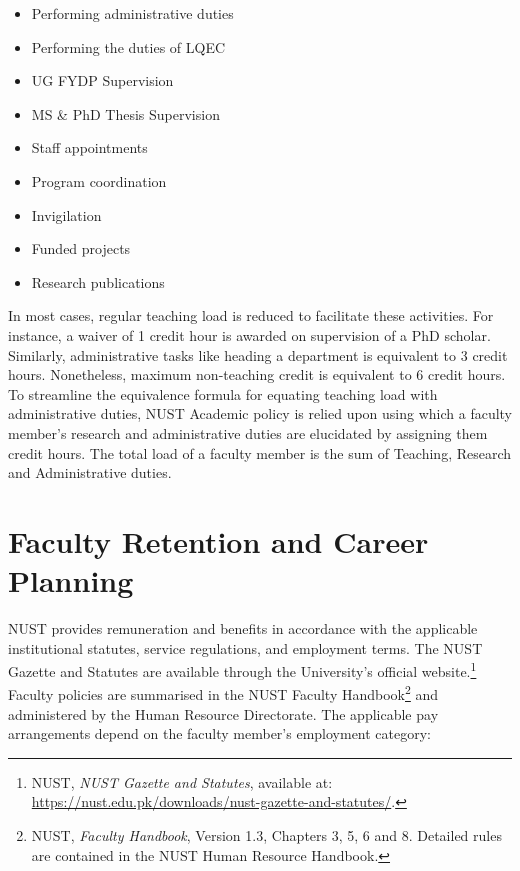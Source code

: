 \begin{itemize}[noitemsep, topsep=0pt]
\item Performing administrative duties 
\item Performing the duties of LQEC
\item UG FYDP Supervision 
\item MS \& PhD Thesis Supervision
\item Staff appointments
\item Program coordination
\item Invigilation 
\item Funded projects
\item Research publications
\end{itemize}

In most cases, regular teaching load is reduced to facilitate these activities. For instance, a waiver of 1 credit hour is awarded on supervision of a PhD scholar. Similarly, administrative tasks like heading a department is equivalent to 3 credit hours. Nonetheless, maximum non-teaching credit is equivalent to 6 credit hours. To streamline the equivalence formula for equating teaching load with administrative duties, NUST Academic policy is relied upon using which a faculty member's research and administrative duties are elucidated by assigning them credit hours. The total load of a faculty member is the sum of Teaching, Research and Administrative duties. 

\hypertarget{faculty-retention-and-career-planning}{%
\section{Faculty Retention and Career Planning}\label{faculty-retention-and-career-planning}}

NUST provides remuneration and benefits in accordance with the applicable
institutional statutes, service regulations, and employment terms. The NUST
Gazette and Statutes are available through the University's official
website.\footnote{NUST, \textit{NUST Gazette and Statutes}, available at:
\url{https://nust.edu.pk/downloads/nust-gazette-and-statutes/}.}
Faculty policies are summarised in the NUST Faculty Handbook\footnote{NUST,
\textit{Faculty Handbook}, Version 1.3, Chapters 3, 5, 6 and 8. Detailed rules
are contained in the NUST Human Resource Handbook.} and administered by the
Human Resource Directorate. The applicable pay arrangements depend on the
faculty member's employment category:

